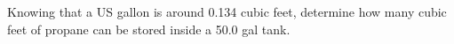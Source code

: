 Knowing that a US gallon is around 0.134 cubic feet, determine 
how many cubic feet of propane can be stored inside a 50.0 gal tank.
